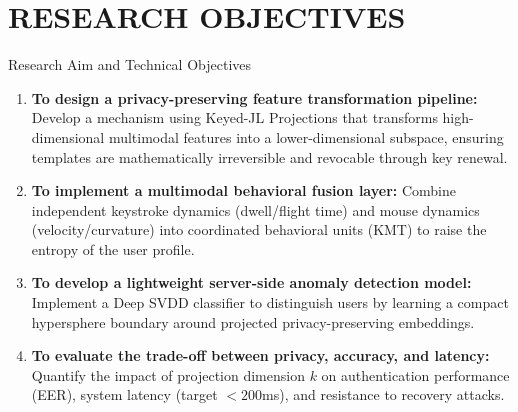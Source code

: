 
\section{RESEARCH OBJECTIVES}

\begin{frame}{Research Aim and Technical Objectives}
    \begin{enumerate}
        \fontsize{8.5pt}{10.5pt}\selectfont
        \setlength{\itemsep}{6pt}
        
        \item \textbf{To design a privacy-preserving feature transformation pipeline:} Develop a mechanism using Keyed-\ac{JL} Projections that transforms high-dimensional multimodal features into a lower-dimensional subspace, ensuring templates are mathematically irreversible and revocable through key renewal.
        
        \item \textbf{To implement a multimodal behavioral fusion layer:} Combine independent keystroke dynamics (dwell/flight time) and mouse dynamics (velocity/curvature) into coordinated behavioral units (\ac{KMT}) to raise the entropy of the user profile.
        
        \item \textbf{To develop a lightweight server-side anomaly detection model:} Implement a \ac{Deep SVDD} classifier to distinguish users by learning a compact hypersphere boundary around projected privacy-preserving embeddings.
        
        \item \textbf{To evaluate the trade-off between privacy, accuracy, and latency:} Quantify the impact of projection dimension $k$ on authentication performance (\ac{EER}), system latency (target $<200$ms), and resistance to recovery attacks.
    \end{enumerate}
\end{frame}
